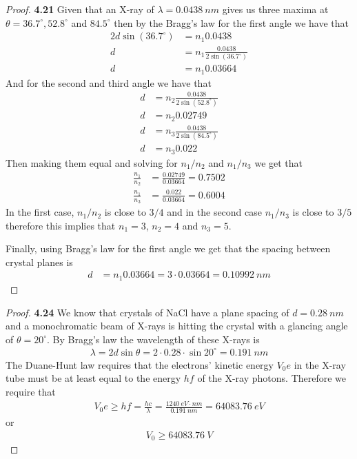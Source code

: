 \documentclass[11pt]{article}
\theoremstyle{definition}
\begin{document}
\begin{proof}{\textbf{4.21}}
    Given that an X-ray of $\lambda = 0.0438~nm$ gives us three maxima at
    $\theta = 36.7^\circ, 52.8^\circ$ and $84.5^\circ$ then by the Bragg's law
    for the first angle we have that
    \begin{align*}
        2d\sin(36.7^\circ) &= n_1 0.0438\\
        d &= n_1\frac{0.0438}{2\sin(36.7^\circ)}\\
        d &= n_1 0.03664
    \end{align*}
    And for the second and third angle we have that
    \begin{align*}
        d &= n_2\frac{0.0438}{2\sin(52.8^\circ)}\\
        d &= n_2 0.02749
    \end{align*}
    \begin{align*}
        d &= n_3\frac{0.0438}{2\sin(84.5^\circ)}\\
        d &= n_3 0.022
    \end{align*}
    Then making them equal and solving for $n_1/n_2$ and $n_1/n_3$ we get that
    \begin{align*}
        \frac{n_1}{n_2} &= \frac{0.02749}{0.03664} = 0.7502\\
        \frac{n_1}{n_3} &= \frac{0.022}{0.03664} = 0.6004
    \end{align*}
    In the first case, $n_1/n_2$ is close to $3/4$ and in the second
    case $n_1/n_3$ is close to $3/5$ therefore this implies that $n_1 = 3$,
    $n_2 = 4$ and $n_3 = 5$.

    Finally, using Bragg's law for the first angle we get that the spacing
    between crystal planes is
    \begin{align*}
        d &= n_1 0.03664 = 3 \cdot 0.03664 = 0.10992~nm
    \end{align*}
\end{proof}
\cleardoublepage
\begin{proof}{\textbf{4.24}}
    We know that crystals of NaCl have a plane spacing of $d = 0.28~nm$ and
    a monochromatic beam of X-rays is hitting the crystal with a glancing
    angle of $\theta = 20^\circ$. By Bragg's law the wavelength of these
    X-rays is 
    \begin{align*}
        \lambda = 2d\sin\theta = 2\cdot 0.28 \cdot \sin 20^\circ = 0.191~nm
    \end{align*}
    The Duane-Hunt law requires that the electrons' kinetic energy $V_0e$ in
    the X-ray tube must be at least equal to the energy $hf$ of the X-ray
    photons. Therefore we require that 
    \begin{align*}
        V_0e \geq hf = \frac{hc}{\lambda} = \frac{1240~eV\cdot nm}{0.191~nm}
        = 64083.76~eV
    \end{align*}
    or
    \begin{align*}
        V_0 \geq 64083.76~V
    \end{align*}
\end{proof}
\end{document}
